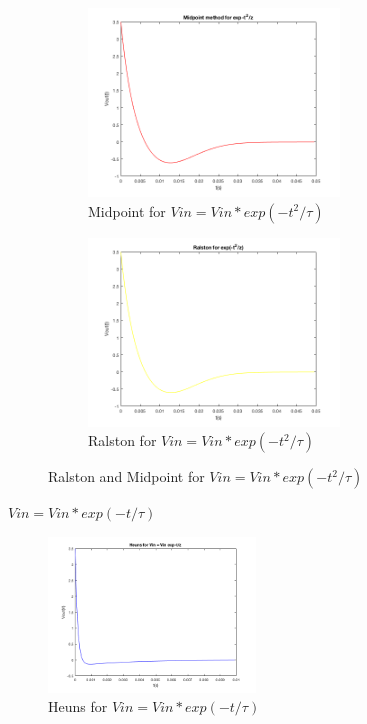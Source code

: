 \documentclass[11pt,a4paper]{article}
\begin{document}
\begin{figure}[h]
\begin{subfigure}{.5\textwidth}
  \includegraphics[width=.9\linewidth,height = 5cm]{Ex1_Figs/mid_t2.png}
  \caption[right]{Midpoint for $Vin = Vin*exp(-t^2/\tau)$}
  \label{fig:RL7}
\end{subfigure}
\begin{subfigure}{.5\textwidth}
  \includegraphics[width=.9\linewidth,height = 5cm]{Ex1_Figs/ral_t2.png}
  \caption{Ralston for $Vin = Vin*exp(-t^2/\tau)$}
  \label{fig:RL8}
\end{subfigure}
\caption{Ralston and Midpoint for $Vin = Vin*exp(-t^2/\tau)$}
\label{fig:RLx}
\end{figure}



\newpage
$Vin = Vin*exp(-t/\tau)$

\begin{figure}
\vspace{-30mm}
\includegraphics[width=0.49\textwidth,center]{Ex1_Figs/heuns_t.png}
\vspace{-6mm}
\caption{Heuns for $Vin = Vin*exp(-t/\tau)$}
\label{fig:RL9}
\end{figure}
\end{document}

